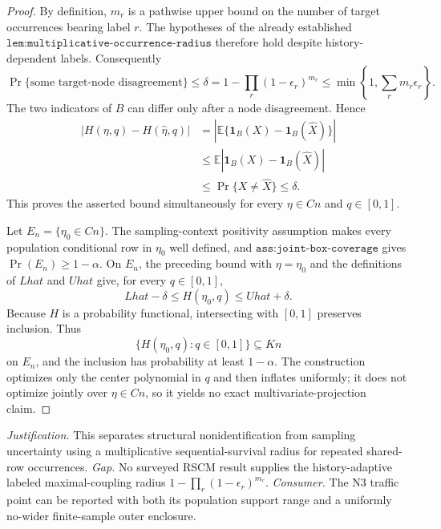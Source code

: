\documentclass{article}
\begin{document}
\begin{proof}
By definition, \(m_r\) is a pathwise upper bound on the number of target occurrences bearing label \(r\).  The hypotheses of the already established \(\texttt{lem:multiplicative-occurrence-radius}\) therefore hold despite history-dependent labels.  Consequently
\[
 \Pr\{\text{some target-node disagreement}\}
 \leq\delta
 =1-\prod_r(1-\epsilon_r)^{m_r}
 \leq\min\left\{1,\sum_rm_r\epsilon_r\right\}.
\]
The two indicators of \(B\) can differ only after a node disagreement.  Hence
\[
 \begin{aligned}
 |H(\eta,q)-H(\widehat\eta,q)|
 &=\left|\mathbb E\{\mathbf1_B(X)-\mathbf1_B(\widehat X)\}\right|\\
 &\leq\mathbb E|\mathbf1_B(X)-\mathbf1_B(\widehat X)|\\
 &\leq\Pr\{X\neq\widehat X\}\leq\delta.
 \end{aligned}
\]
This proves the asserted bound simultaneously for every \(\eta\in Cn\) and \(q\in[0,1]\).

Let \(E_n=\{\eta_0\in Cn\}\).  The sampling-context positivity assumption makes every population conditional row in \(\eta_0\) well defined, and \(\texttt{ass:joint-box-coverage}\) gives \(\Pr(E_n)\geq1-\alpha\).  On \(E_n\), the preceding bound with \(\eta=\eta_0\) and the definitions of \(Lhat\) and \(Uhat\) give, for every \(q\in[0,1]\),
\[
 Lhat-\delta\leq H(\eta_0,q)\leq Uhat+\delta.
\]
Because \(H\) is a probability functional, intersecting with \([0,1]\) preserves inclusion.  Thus
\[
 \{H(\eta_0,q):q\in[0,1]\}\subseteq Kn
\]
on \(E_n\), and the inclusion has probability at least \(1-\alpha\).  The construction optimizes only the center polynomial in \(q\) and then inflates uniformly; it does not optimize jointly over \(\eta\in Cn\), so it yields no exact multivariate-projection claim.
\end{proof}
\par\smallskip\noindent \textit{Justification.} This separates structural nonidentification from sampling uncertainty using a multiplicative sequential-survival radius for repeated shared-row occurrences. \textit{Gap.} No surveyed RSCM result supplies the history-adaptive labeled maximal-coupling radius \(1-\prod_r(1-\epsilon_r)^{m_r}\). \textit{Consumer.} The N3 traffic point can be reported with both its population support range and a uniformly no-wider finite-sample outer enclosure.
\end{document}
